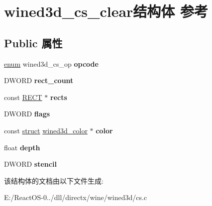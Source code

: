 \hypertarget{structwined3d__cs__clear}{}\section{wined3d\+\_\+cs\+\_\+clear结构体 参考}
\label{structwined3d__cs__clear}
\subsection*{Public 属性}
\begin{DoxyCompactItemize}
\item 
\mbox{\label{structwined3d__cs__clear_ae80a3229347df08a205093469db52690}} 
\hyperlink{interfaceenum}{enum} wined3d\+\_\+cs\+\_\+op {\bfseries opcode}
\item 
\mbox{\label{structwined3d__cs__clear_ae066a949d36a8b22f63086f0f76d7e33}} 
D\+W\+O\+RD {\bfseries rect\+\_\+count}
\item 
\mbox{\label{structwined3d__cs__clear_acbd24d10720af3c90e5d6318e2281847}} 
const \hyperlink{structtag_r_e_c_t}{R\+E\+CT} $\ast$ {\bfseries rects}
\item 
\mbox{\label{structwined3d__cs__clear_ae492ba6f7f6154c8d618cc0cf4fb6f42}} 
D\+W\+O\+RD {\bfseries flags}
\item 
\mbox{\label{structwined3d__cs__clear_ae4d38b852f6b111605a179d7b852d659}} 
const \hyperlink{interfacestruct}{struct} \hyperlink{structwined3d__color}{wined3d\+\_\+color} $\ast$ {\bfseries color}
\item 
\mbox{\label{structwined3d__cs__clear_a37c989c73100143d883bd1699c4d74c7}} 
float {\bfseries depth}
\item 
\mbox{\label{structwined3d__cs__clear_a98824e6052f53ad58b875be5d614472d}} 
D\+W\+O\+RD {\bfseries stencil}
\end{DoxyCompactItemize}


该结构体的文档由以下文件生成\+:\begin{DoxyCompactItemize}
\item 
E\+:/\+React\+O\+S-\/0../dll/directx/wine/wined3d/cs.\+c\end{DoxyCompactItemize}
